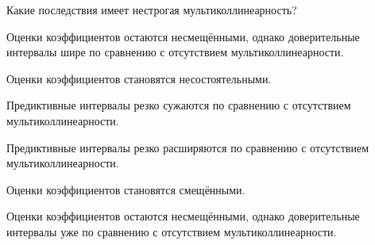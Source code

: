 
\begin{question}
Какие последствия имеет нестрогая мультиколлинеарность?
\begin{answerlist}
  \item Оценки коэффициентов остаются несмещёнными, однако доверительные интервалы шире по сравнению с отсутствием мультиколлинеарности.
  \item Оценки коэффициентов становятся несостоятельными.
  \item Предиктивные интервалы резко сужаются по сравнению с отсутствием мультиколлинеарности.
  \item Предиктивные интервалы резко расширяются по сравнению с отсутствием мультиколлинеарности.
  \item Оценки коэффициентов становятся смещёнными.
  \item Оценки коэффициентов остаются несмещёнными, однако доверительные интервалы уже по сравнению с отсутствием мультиколлинеарности.
\end{answerlist}
\end{question}



